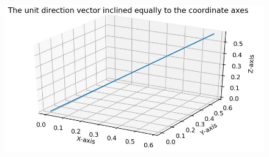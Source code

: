 \documentclass{article}
\begin{document}
\begin{figure}[!htb]
	
	\centering
	
	\includegraphics[width=\columnwidth]{assignment1figure.jpg}
	
	\caption{\label{fig1}}
	
	\label{fig:}
	
\end{figure}
\end{document}

